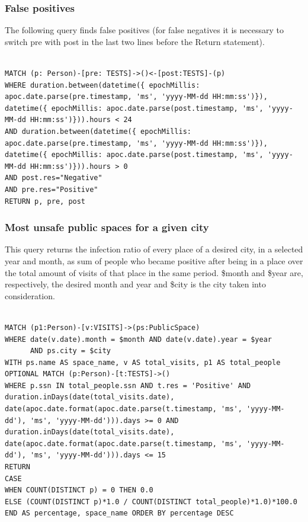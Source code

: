 \documentclass{article}
\begin{document}
\subsubsection{False positives}

The following query finds false positives (for false negatives it is necessary to switch pre with post in the last two lines before the Return statement).
\begin{lstlisting}[language=cypher, label=lst:cypher-example]

MATCH (p: Person)-[pre: TESTS]->()<-[post:TESTS]-(p)
WHERE duration.between(datetime({ epochMillis: apoc.date.parse(pre.timestamp, 'ms', 'yyyy-MM-dd HH:mm:ss')}), datetime({ epochMillis: apoc.date.parse(post.timestamp, 'ms', 'yyyy-MM-dd HH:mm:ss')})).hours < 24
AND duration.between(datetime({ epochMillis: apoc.date.parse(pre.timestamp, 'ms', 'yyyy-MM-dd HH:mm:ss')}), datetime({ epochMillis: apoc.date.parse(post.timestamp, 'ms', 'yyyy-MM-dd HH:mm:ss')})).hours > 0
AND post.res="Negative"
AND pre.res="Positive"
RETURN p, pre, post
\end{lstlisting}

\subsubsection{Most unsafe public spaces for a given city}
This query returns the infection ratio of every place of a desired city, in a selected year and month, as sum of people who became positive after being in a place over the total amount of visits of that place in the same period.
\$month and \$year are, respectively, the desired month and year and \$city is the city taken into consideration.
\begin{lstlisting}[language=cypher, label=lst:cypher-example]

MATCH (p1:Person)-[v:VISITS]->(ps:PublicSpace)
WHERE date(v.date).month = $month AND date(v.date).year = $year
      AND ps.city = $city
WITH ps.name AS space_name, v AS total_visits, p1 AS total_people
OPTIONAL MATCH (p:Person)-[t:TESTS]->()
WHERE p.ssn IN total_people.ssn AND t.res = 'Positive' AND duration.inDays(date(total_visits.date), date(apoc.date.format(apoc.date.parse(t.timestamp, 'ms', 'yyyy-MM-dd'), 'ms', 'yyyy-MM-dd'))).days >= 0 AND duration.inDays(date(total_visits.date), date(apoc.date.format(apoc.date.parse(t.timestamp, 'ms', 'yyyy-MM-dd'), 'ms', 'yyyy-MM-dd'))).days <= 15
RETURN
CASE
WHEN COUNT(DISTINCT p) = 0 THEN 0.0
ELSE (COUNT(DISTINCT p)*1.0 / COUNT(DISTINCT total_people)*1.0)*100.0
END AS percentage, space_name ORDER BY percentage DESC
\end{lstlisting}
\end{document}
